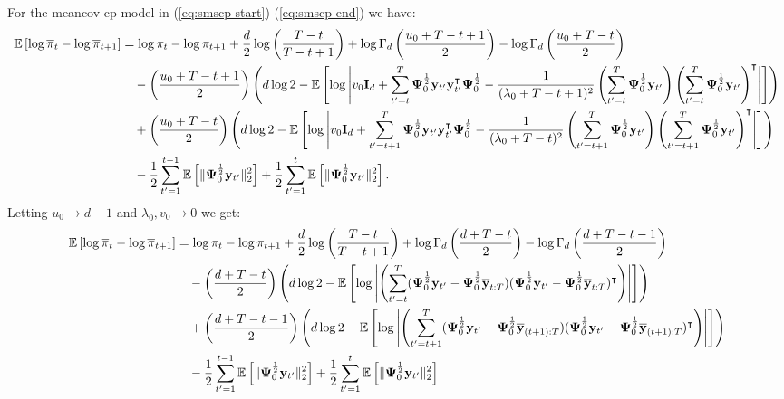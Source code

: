For the meancov-cp model in (\ref{eq:smscp-start})-(\ref{eq:smscp-end}) we have:
\scriptsize
\begin{align*}
    \mathbb{E}\left[\log\overline{\pi}_t - \log \overline{\pi}_{t+1} \right] &= \log \pi_t- \log \pi_{t+1} + \frac{d}{2}\log\left(\frac{T-t}{T-t+1}\right) +\log \Gamma_d\left(\frac{u_0 + T-t+1}{2}\right) - \log \Gamma_d\left(\frac{u_0 + T-t}{2}\right) \\
    &\quad - \left(\frac{u_0 + T - t+1}{2}\right)\left(d\log 2 - \mathbb{E}\left[\log \left|v_0\mathbf{I}_d +  \sum_{t'=t}^{T} \boldsymbol{\Psi}^{\frac{1}{2}}_{0}\mathbf{y}_{t'}\mathbf{y}^\intercal_{t'}\boldsymbol{\Psi}^{\frac{1}{2}}_{0}- \frac{1}{(\lambda_0 +T -t+1)^2} \left(\sum_{t'=t}^T \boldsymbol{\Psi}^{\frac{1}{2}}_{0}\mathbf{y}_{t'}\right)\left(\sum_{t'=t}^T \boldsymbol{\Psi}^{\frac{1}{2}}_{0}\mathbf{y}_{t'}\right)^{\intercal}\right| \right]\right) \\
    &\quad + \left(\frac{u_0 + T - t}{2}\right)\left(d\log 2 - \mathbb{E}\left[\log \left|v_0\mathbf{I}_d +  \sum_{t'=t+1}^{T} \boldsymbol{\Psi}^{\frac{1}{2}}_{0}\mathbf{y}_{t'}\mathbf{y}^\intercal_{t'}\boldsymbol{\Psi}^{\frac{1}{2}}_{0} - \frac{1}{(\lambda_0 +T -t)^2} \left(\sum_{t'=t+1}^T \boldsymbol{\Psi}^{\frac{1}{2}}_{0}\mathbf{y}_{t'}\right)\left(\sum_{t'=t+1}^T \boldsymbol{\Psi}^{\frac{1}{2}}_{0}\mathbf{y}_{t'}\right)^{\intercal} \right| \right]\right) \\
    &\quad- \frac{1}{2}\sum_{t'=1}^{t-1} \mathbb{E}\left[\lVert\boldsymbol{\Psi}_{0}^{\frac{1}{2}}\mathbf{y}_{t'}\rVert_2^2 \right] + \frac{1}{2}\sum_{t'=1}^{t} \mathbb{E}\left[\lVert\boldsymbol{\Psi}_{0}^{\frac{1}{2}}\mathbf{y}_{t'}\rVert_2^2 \right].
\end{align*}
\normalsize
Letting $u_0\to d-1$ and $\lambda_0,v_0 \to 0$ we get:
\small
\begin{align*}
    \mathbb{E}\left[\log\overline{\pi}_t - \log \overline{\pi}_{t+1} \right] &= \log \pi_t- \log \pi_{t+1} + \frac{d}{2}\log\left(\frac{T-t}{T-t+1}\right) +\log \Gamma_d\left(\frac{d + T-t}{2}\right) - \log \Gamma_d\left(\frac{d + T-t - 1}{2}\right) \\
    &\quad - \left(\frac{d + T - t}{2}\right)\left(d\log 2 - \mathbb{E}\left[\log \left|\left(\sum_{t'=t}^{T} (\boldsymbol{\Psi}^{\frac{1}{2}}_{0}\mathbf{y}_{t'} - \boldsymbol{\Psi}^{\frac{1}{2}}_{0}\overline{\mathbf{y}}_{t:T})(\boldsymbol{\Psi}^{\frac{1}{2}}_{0}\mathbf{y}_{t'} - \boldsymbol{\Psi}^{\frac{1}{2}}_{0}\overline{\mathbf{y}}_{t:T})^\intercal\right)\right| \right]\right) \\
    &\quad + \left(\frac{d + T - t-1}{2}\right)\left(d\log 2 - \mathbb{E}\left[\log \left|\left(\sum_{t'=t+1}^{T} (\boldsymbol{\Psi}^{\frac{1}{2}}_{0}\mathbf{y}_{t'} - \boldsymbol{\Psi}^{\frac{1}{2}}_{0}\overline{\mathbf{y}}_{(t+1):T})(\boldsymbol{\Psi}^{\frac{1}{2}}_{0}\mathbf{y}_{t'} - \boldsymbol{\Psi}^{\frac{1}{2}}_{0}\overline{\mathbf{y}}_{(t+1):T})^\intercal\right)\right| \right]\right) \\
    &\quad- \frac{1}{2}\sum_{t'=1}^{t-1} \mathbb{E}\left[\lVert\boldsymbol{\Psi}_{0}^{\frac{1}{2}}\mathbf{y}_{t'}\rVert_2^2 \right] + \frac{1}{2}\sum_{t'=1}^{t} \mathbb{E}\left[\lVert\boldsymbol{\Psi}_{0}^{\frac{1}{2}}\mathbf{y}_{t'}\rVert_2^2 \right]
\end{align*}

